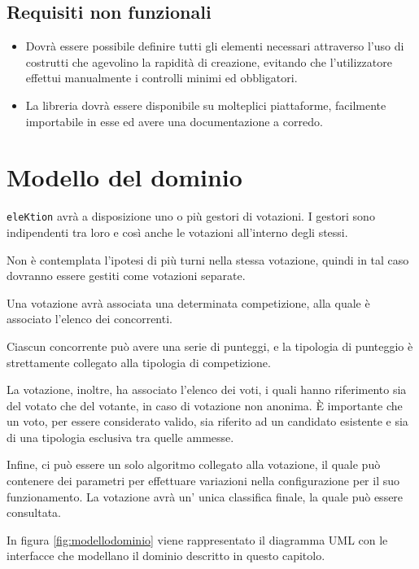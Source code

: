 \documentclass[12pt,a4paper,openright,twoside]{book}
\begin{document}
    \subsection{Requisiti non funzionali}
    \begin{itemize}
        \item{Dovrà essere possibile definire tutti gli elementi necessari attraverso l'uso di costrutti che agevolino la rapidità di creazione,
        evitando che l'utilizzatore effettui manualmente i controlli minimi ed obbligatori.}
    \item{La libreria dovrà essere disponibile su molteplici piattaforme, facilmente importabile in esse ed avere una documentazione
    a corredo.}
    \end{itemize}


\section{Modello del dominio}
\texttt{eleKtion} avrà a disposizione uno o più gestori di votazioni. 
I gestori sono indipendenti tra loro e così anche le votazioni all'interno degli stessi.

Non è contemplata l'ipotesi di più turni nella stessa votazione, 
quindi in tal caso dovranno essere gestiti come votazioni separate.

Una votazione avrà associata una determinata competizione, 
alla quale è associato l'elenco dei concorrenti. 

Ciascun concorrente può avere una serie di punteggi,
 e la tipologia di punteggio è strettamente collegato alla tipologia di competizione.

La votazione, inoltre, ha associato l'elenco dei voti,
i quali hanno riferimento sia del votato che del votante,
in caso di votazione non anonima.
È importante che un voto, per essere considerato valido, 
sia riferito ad un candidato esistente e sia di una tipologia esclusiva tra quelle ammesse.

Infine, ci può essere un solo algoritmo collegato alla votazione,
il quale può contenere dei parametri per effettuare variazioni nella configurazione per il suo funzionamento.
La votazione avrà un' unica classifica finale, la quale può essere consultata.

In figura \ref{fig:modellodominio} viene rappresentato il diagramma UML con le interfacce che modellano
il dominio descritto in questo capitolo.
\newpage
\end{document}
